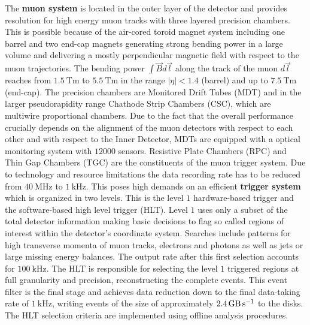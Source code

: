The \textbf{muon system} is located in the outer layer of the {\ATLAS} detector and provides resolution for high energy muon tracks with three layered precision chambers. This is possible because of the air-cored toroid magnet system including one barrel and two end-cap magnets generating strong bending power in a large volume and delivering  a mostly perpendicular magnetic field with respect to the muon trajectories. The bending power $\int{\vec{B}d\vec{l}}$ along the track of the muon $d\vec{l}$ reaches from $\SI{1.5}{\tesla\meter}$ to $\SI{5.5}{\tesla\meter}$ in the range $|\eta|<1.4$ (barrel) and up to $\SI{7.5}{\tesla\meter}$ (end-cap). The precision chambers are Monitored Drift Tubes (MDT) and in the larger pseudorapidity range Chathode Strip Chambers (CSC), which are multiwire proportional chambers. Due to the fact that the overall performance crucially depends on the alignment of the muon detectors with respect to each other and with respect to the Inner Detector, MDTs are equipped with a optical monitoring system with $12000$ sensors. Resistive Plate Chambers (RPC) and Thin Gap Chambers (TGC) are the constituents of the muon trigger system. \cite{ATLASJINST} \newline %
Due to technology and resource limitations the data recording rate has to be reduced from $\SI{40}{\mega\hertz}$ to $\SI{1}{\kilo\hertz}$. This poses high demands on an efficient \textbf{trigger system} which is organized in two levels. This is the level $1$ hardware-based trigger and the software-based high level trigger (HLT). Level $1$ uses only a subset of the total detector information making basic decisions to flag so called regions of interest within the detector's coordinate system. Searches include patterns for high transverse momenta of muon tracks, electrons and photons as well as jets or large missing energy balances. The output rate after this first selection accounts for $\SI{100}{\kilo\hertz}$. The HLT is responsible for selecting the level $1$ triggered regions at full granularity and precision, reconstructing the complete events. This event filter is the final stage and achieves data reduction down to the final data-taking rate of $\SI{1}{\kilo\hertz}$, writing events of the size of approximately $\SI{2.4}{\giga\byte\per\second}$ to the disks. The HLT selection criteria are implemented using offline analysis procedures. \cite{ATLASJINST}\cite{newATLASJINST} %
